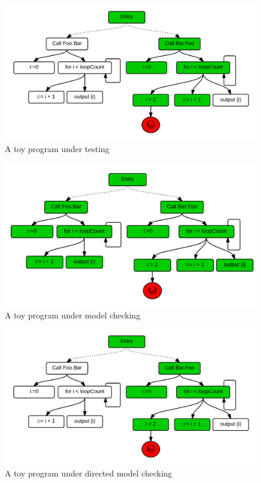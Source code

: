 \begin{figure}[h!]
  \centering
    \includegraphics{media/dmc.png}
    \caption{A toy program under testing
    \label{fig:testing-toy}}
\end{figure}

\begin{figure}[h!]
  \centering
    \includegraphics{media/mc.png}
    \caption{A toy program under model checking
    \label{fig:checking-toy}}
\end{figure}

\begin{figure}[h!]
  \centering
    \includegraphics{media/dmc.png}
    \caption{A toy program under directed model checking
    \label{fig:dchecking-toy}}
\end{figure}

